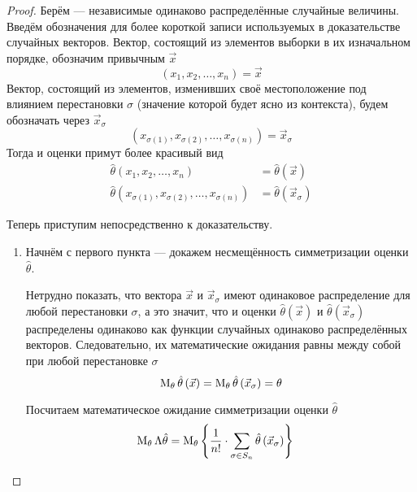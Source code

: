 \begin{proof}
  Берём \xsample --- независимые одинаково распределённые
  случайные величины.
  Введём обозначения для более короткой записи
  используемых в доказательстве случайных векторов.
  Вектор, состоящий из элементов выборки в их изначальном порядке,
  обозначим привычным $\vec{x}$
  \begin{equation*}
    \left(x_1, x_2, \dots, x_n\right) = \vec{x}
  \end{equation*}
  Вектор, состоящий из элементов, изменивших своё местоположение под влиянием
  перестановки $\sigma$ (значение которой будет ясно из контекста),
  будем обозначать через $\vec{x}_\sigma$
  \begin{equation*}
    \left(x_{\sigma\left(1\right)}, x_{\sigma\left(2\right)},
      \dots, x_{\sigma\left(n\right)}\right)= \vec{x}_\sigma
  \end{equation*}
  Тогда и оценки примут более красивый вид
  \begin{align*}
      \hat{\theta}\left(x_1, x_2, \dots, x_n\right)
      &= \hat{\theta}\left(\vec{x}\right)\\
      \hat{\theta}\left(x_{\sigma\left(1\right)},
          x_{\sigma\left(2\right)},
          \dots, x_{\sigma\left(n\right)}\right)
      &= \hat{\theta}\left(\vec{x}_\sigma\right)
  \end{align*}

  Теперь приступим непосредственно к доказательству.
  \begin{enumerate}
      \item
      Начнём с первого пункта --- докажем несмещённость
      симметризации оценки $\hat{\theta}$.

      Нетрудно показать, что  вектора $\vec{x}$ и $\vec{x}_\sigma$
      имеют одинаковое распределение для любой перестановки $\sigma$,
      а это значит, что и оценки $\hat{\theta}\left(\vec{x}\right)$
      и $\hat{\theta}\left(\vec{x}_\sigma\right)$
      распределены одинаково как функции случайных
      одинаково распределённых векторов.
      Следовательно, их математические ожидания равны между собой
      при любой перестановке $\sigma$
      $$\operatorname{M}_{\theta} \hat{\theta}\left(\vec{x}\right)
          = \operatorname{M}_{\theta} \hat{\theta}\left(\vec{x}_\sigma\right)
          = \theta$$

      Посчитаем математическое ожидание симметризации оценки
      $\hat{\theta}$
      \begin{align*}
          \operatorname{M}_{\theta} \Lambda\hat{\theta}
        &= \operatorname{M}_{\theta} 
            \left\{\frac{1}{n!}\cdot \sum_{\sigma\in S_n}
            \hat{\theta}\left(\vec{x}_\sigma\right)\right\}
      \end{align*}


\end{enumerate}
\end{proof}
